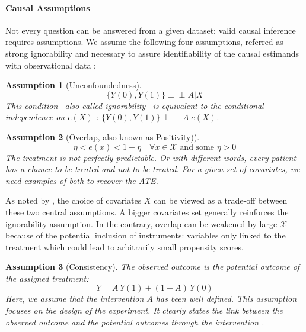 \documentclass[french,12pt,twoside,a4paper]{book}
\newcommand{\indep}{\perp \!\!\! \perp}
\newtheorem{assumption}{Assumption}
\begin{document}
\begin{background_box_left}

  \paragraph{Causal Assumptions}\label{background:causal_assumptions}

  Not every question can be answered from a given dataset: valid causal
  inference requires assumptions. We assume the following
  four assumptions, referred as strong ignorability and necessary to assure
  identifiability of the causal estimands with observational data
  \citep{rubin_causal_2005}:
  \begin{assumption}[Unconfoundedness]\label{assumption:ignorability}
    \begin{equation*}\label{eq:ignorability}
      \{Y(0), Y(1) \} \indep A | X
    \end{equation*}
    This condition --also called ignorability-- is equivalent to the conditional
    independence on $e(X)$ \citep{rosenbaum_central_1983}: $\{Y(0), Y(1) \}
      \indep  A | e(X)$.
  \end{assumption}


  \begin{assumption}[Overlap, also known as Positivity)]\label{assumption:overlap}
    \begin{equation*}\label{eq:overlap}
      \eta < e(x) < 1 - \eta \quad \forall x \in \mathcal X \text{ and some } \eta > 0
    \end{equation*}
    The treatment is not perfectly predictable. Or with different words, every
    patient has a chance to be treated and not to be treated. For a given set of
    covariates, we need examples of both to recover the ATE.
  \end{assumption}

  As noted by \cite{damour_overlap_2020}, the choice of covariates $X$ can
  be viewed as a trade-off between these two central assumptions. A bigger
  covariates set generally reinforces the ignorability assumption. In the
  contrary, overlap can be weakened by large $\mathcal{X}$ because of the
  potential inclusion of instruments: variables only linked to the treatment which
  could lead to arbitrarily small propensity scores.


  \begin{assumption}[Consistency]\label{assumption:consistency} The observed
    outcome is the potential outcome of the assigned treatment:
    \begin{equation*}\label{eq:consistancy}
      Y = A \, Y(1) + (1-A) \, Y(0)
    \end{equation*}
    Here, we assume that the intervention $A$ has been well defined. This
    assumption focuses on the design of the experiment. It clearly states the link
    between the observed outcome and the potential outcomes through the
    intervention \citep{hernan_causal_2020}.
  \end{assumption}


\end{background_box_left}
\end{document}
